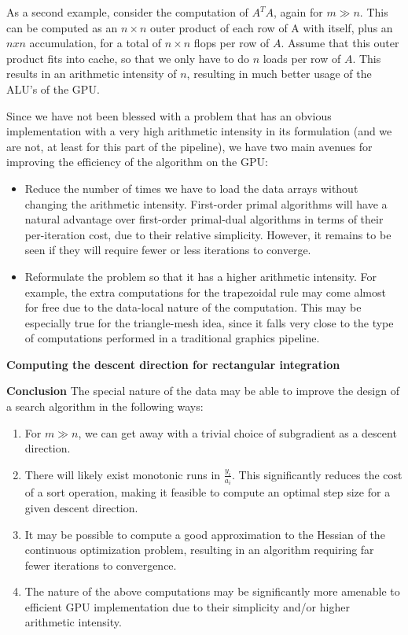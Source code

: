 \documentclass[12pt,journal,draftcls,letterpaper,onecolumn]{IEEEtran}
\begin{document}
As a second example, consider the computation of $A^T A$, again for $m \gg n$.  This can be computed as an $n \times n$ outer product of each row of A with itself, plus an $n x n$ accumulation, for a total of $n \times n$ flops per row of $A$.  Assume that this outer product fits into cache, so that we only have to do $n$ loads per row of $A$.  This results in an arithmetic intensity of $n$, resulting in much better usage of the ALU's of the GPU.

Since we have not been blessed with a problem that has an obvious implementation with a very high arithmetic intensity in its formulation (and we are not, at least for this part of the pipeline), we have two main avenues for improving the efficiency of the algorithm on the GPU:
\begin{itemize}
\item Reduce the number of times we have to load the data arrays without changing the arithmetic intensity.  First-order primal algorithms will have a natural advantage over first-order primal-dual algorithms in terms of their per-iteration cost, due to their relative simplicity.  However, it remains to be seen if they will require fewer or less iterations to converge.
\item Reformulate the problem so that it has a higher arithmetic intensity.  For example, the extra computations for the trapezoidal rule may come almost for free due to the data-local nature of the computation.  This may be especially true for the triangle-mesh idea, since it falls very close to the type of computations performed in a traditional graphics pipeline.
\end{itemize}


{\bf Computing the descent direction for rectangular integration }


{\bf Conclusion } The special nature of the data may be able to improve the design of a search algorithm in the following ways:
\begin{enumerate}
\item For $m \gg n$, we can get away with a trivial choice of subgradient as a descent direction.
\item There will likely exist monotonic runs in $\frac{y_i}{a_i}$.  This significantly reduces the cost of a sort operation, making it feasible to compute an optimal step size for a given descent direction.  
\item It may be possible to compute a good approximation to the Hessian of the continuous optimization problem, resulting in an algorithm requiring far fewer iterations to convergence.  
\item The nature of the above computations may be significantly more amenable to efficient GPU implementation due to their simplicity and/or higher arithmetic intensity.
\end{enumerate}
\end{document}
